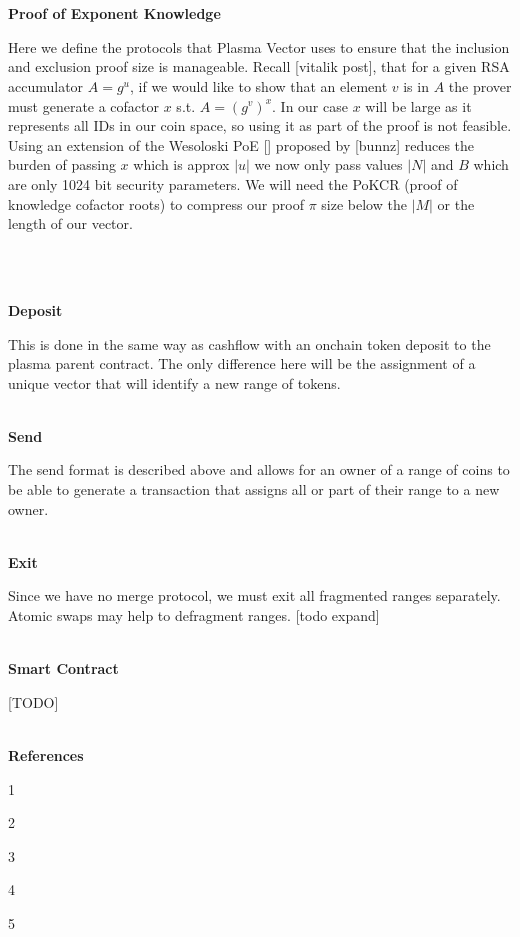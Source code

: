 \documentclass[11pt]{article}
\begin{document}
\\
\\

\centerline{\textbf{Proof of Exponent Knowledge}}

Here we define the protocols that Plasma Vector uses to ensure that the inclusion and exclusion proof size is manageable. Recall [vitalik post], that for a given RSA accumulator $A = g^u$, if we would like to show that an element $v$ is in $A$ the prover must generate a cofactor $x$ s.t. $A = (g^v)^x$. In our case $x$ will be large as it represents all IDs in our coin space, so using it as part of the proof is not feasible. Using an extension of the Wesoloski PoE [] proposed by [bunnz] reduces the burden of passing $x$ which is approx $|u|$ we now only pass values $|N|$ and $B$ which are only 1024 bit security parameters. We will need the PoKCR (proof of knowledge cofactor roots) to compress our proof $\pi$ size below the $|M|$ or the length of our vector.


\\ 
\\
\centerline{\textbf{Deposit}}

This is done in the same way as cashflow with an onchain token deposit to the plasma parent contract. The only difference here will be the assignment of a unique vector that will identify a new range of tokens. 
\\
\\
\centerline{\textbf{Send}}

The send format is described above and allows for an owner of a range of coins to be able to generate a transaction that assigns all or part of their range to a new owner. 
\\
\\
\centerline{\textbf{Exit}}

Since we have no merge protocol, we must exit all fragmented ranges separately. Atomic swaps may help to defragment ranges. [todo expand]
\\
\\
\centerline{\textbf{Smart Contract}}

[TODO]
\\
\\
\centerline{\textbf{References}}

1 \url{}

2 \url{}

3 \url{}

4 \url{}

5 \url{}
\end{document}
